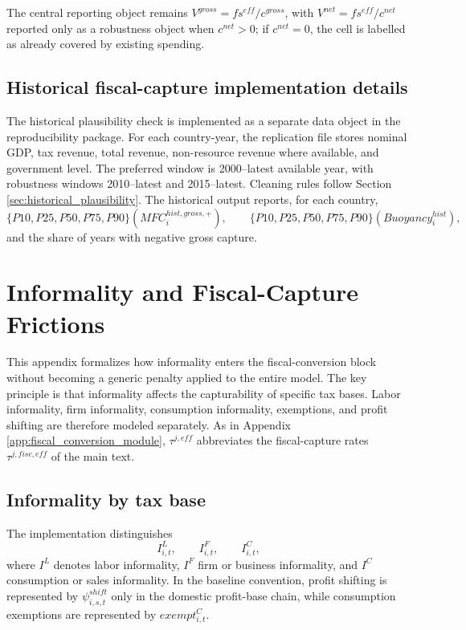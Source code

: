\documentclass[11pt,a4paper]{article}
\begin{document}
The central reporting object remains $V^{gross}=fs^{eff}/c^{gross}$, with $V^{net}=fs^{eff}/c^{net}$ reported only as a robustness object when $c^{net}>0$; if $c^{net}=0$, the cell is labelled as already covered by existing spending.

\subsection{Historical fiscal-capture implementation details}

The historical plausibility check is implemented as a separate data object in the reproducibility package. For each country-year, the replication file stores nominal GDP, tax revenue, total revenue, non-resource revenue where available, and government level. The preferred window is 2000--latest available year, with robustness windows 2010--latest and 2015--latest. Cleaning rules follow Section \ref{sec:historical_plausibility}. The historical output reports, for each country,
\begin{equation}
    \{P10,P25,P50,P75,P90\}\left(MFC^{hist,gross,+}_i\right),
    \qquad
    \{P10,P25,P50,P75,P90\}\left(Buoyancy^{hist}_i\right),
\end{equation}
and the share of years with negative gross capture.


\section{Informality and Fiscal-Capture Frictions}\label{app:informality_module}

This appendix formalizes how informality enters the fiscal-conversion block without becoming a generic penalty applied to the entire model. The key principle is that informality affects the capturability of specific tax bases. Labor informality, firm informality, consumption informality, exemptions, and profit shifting are therefore modeled separately. As in Appendix \ref{app:fiscal_conversion_module}, $\tau^{j,eff}$ abbreviates the fiscal-capture rates $\tau^{j,fisc,eff}$ of the main text.

\subsection{Informality by tax base}

The implementation distinguishes
\begin{equation}
    I^L_{i,t},\qquad I^F_{i,t},\qquad I^C_{i,t},
\end{equation}
where $I^L$ denotes labor informality, $I^F$ firm or business informality, and $I^C$ consumption or sales informality. In the baseline convention, profit shifting is represented by $\psi^{shift}_{i,s,t}$ only in the domestic profit-base chain, while consumption exemptions are represented by $exempt^C_{i,t}$.
\end{document}
